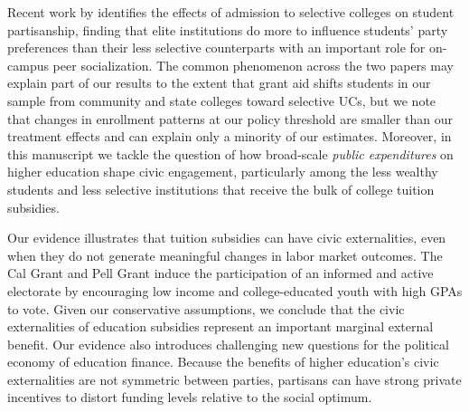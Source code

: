 \documentclass[12pt,letterpaper,oneside]{book}
\begin{document}
Recent work by \cite{firoozi_effect_2023} identifies the effects of admission to selective colleges on student partisanship, finding that elite institutions do more to influence students' party preferences than their less selective counterparts with an important role for on-campus peer socialization. The common phenomenon across the two papers may explain part of our results to the extent that grant aid shifts students in our sample from community and state colleges toward selective UCs, but we note that changes in enrollment patterns at our policy threshold are smaller than our treatment effects and can explain only a minority of our estimates. Moreover, in this manuscript we tackle the question of how broad-scale \textit{public expenditures} on higher education shape civic engagement, particularly among the less wealthy students and less selective institutions that receive the bulk of college tuition subsidies.


Our evidence illustrates that tuition subsidies can have civic externalities, even when they do not generate meaningful changes in labor market outcomes. The Cal Grant and Pell Grant induce the participation of an informed and active electorate by encouraging low income and college-educated youth with high GPAs to vote. Given our conservative assumptions, we conclude that the civic externalities of education subsidies represent an important marginal external benefit. Our evidence also introduces challenging new questions for the political economy of education finance. Because the benefits of higher education's civic externalities are not symmetric between parties, partisans can have strong private incentives to distort funding levels relative to the social optimum.
\end{document}
